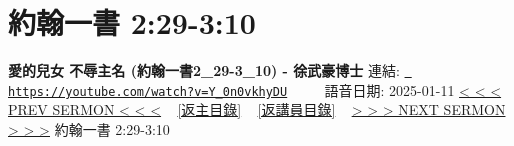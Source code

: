\documentclass{book}
\begin{document}
\section{約翰一書 2:29-3:10}
\label{sec:Y_0n0vkhyDU}
\textbf{愛的兒女 不辱主名 (約翰一書2\_29-3\_10) - 徐武豪博士}
\newline
\newline
連結: \href{https://youtube.com/watch?v=Y_0n0vkhyDU}{\texttt{ https://youtube.com/watch?v=Y\_0n0vkhyDU}} ~~~~ 語音日期: 2025-01-11 
\newline
\newline
\hyperref[sec:MfR5_HAo14I]{< < < PREV SERMON < < <}
~
\hyperlink{toc}{[返主目錄]}
~
\hyperref[ch:preacher1]{[返講員目錄]}
~
\hyperref[sec:K8E95o7ZcvU]{> > > NEXT SERMON > > >}
\newline
\newline
約翰一書 2:29-3:10
\newline
\end{document}
